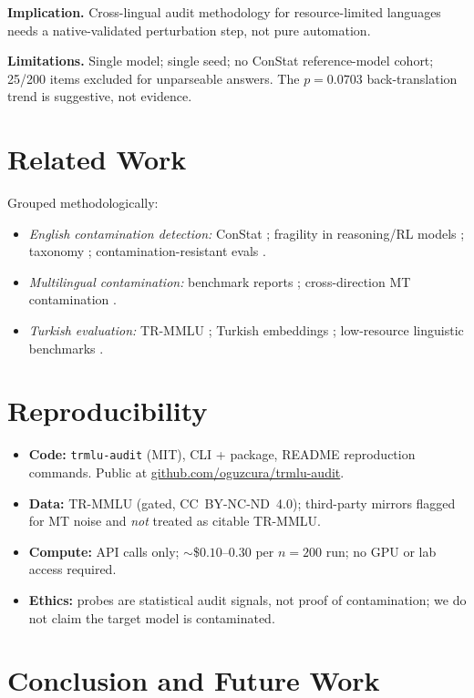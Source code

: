 \documentclass[11pt]{article}
\begin{document}
\textbf{Implication.} Cross-lingual audit methodology for resource-limited languages needs a native-validated perturbation step, not pure automation.

\textbf{Limitations.} Single model; single seed; no ConStat reference-model cohort; 25/200 items excluded for unparseable answers. The $p{=}0.0703$ back-translation trend is suggestive, not evidence.

\section{Related Work}

Grouped methodologically:
\begin{itemize}
\item \emph{English contamination detection:} ConStat \cite{constat2024}; fragility in reasoning/RL models \cite{fragile2025reasoning}; taxonomy \cite{taxonomy2024}; contamination-resistant evals \cite{beyondbench2025}.
\item \emph{Multilingual contamination:} benchmark reports \cite{contammulti2024}; cross-direction MT contamination \cite{flores2026}.
\item \emph{Turkish evaluation:} TR-MMLU \cite{trmmu2024}; Turkish embeddings \cite{turkembed2025}; low-resource linguistic benchmarks \cite{lingoly2024}.
\end{itemize}

\section{Reproducibility}

\begin{itemize}
\item \textbf{Code:} \texttt{trmlu-audit} (MIT), CLI + package, README reproduction commands. Public at \url{github.com/oguzcura/trmlu-audit}.
\item \textbf{Data:} TR-MMLU (gated, CC~BY-NC-ND~4.0); third-party mirrors flagged for MT noise and \emph{not} treated as citable TR-MMLU.
\item \textbf{Compute:} API calls only; $\sim$\$$0.10$--$0.30$ per $n{=}200$ run; no GPU or lab access required.
\item \textbf{Ethics:} probes are statistical audit signals, not proof of contamination; we do not claim the target model is contaminated.
\end{itemize}

\section{Conclusion and Future Work}
\end{document}
